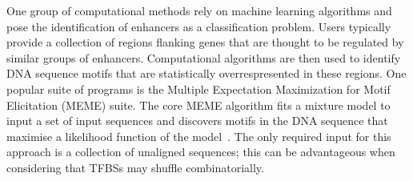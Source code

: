 





        
        One group of computational methods rely on machine learning algorithms and pose the identification of enhancers as a classification problem. Users typically provide a collection of regions flanking genes that are thought to be regulated by similar groups of enhancers. Computational algorithms are then used to identify DNA sequence motifs that are statistically overrespresented in these regions. One popular suite of programs is the Multiple Expectation Maximization for Motif Elicitation (MEME) suite. The core MEME algorithm fits a mixture model to input a set of input sequences and discovers motifs in the DNA sequence that maximise a likelihood function of the model~\cite{bailey1994fitting}. The only required input for this approach is a collection of unaligned sequences; this can be advantageous when considering that TFBSs may shuffle combinatorially. 
        
